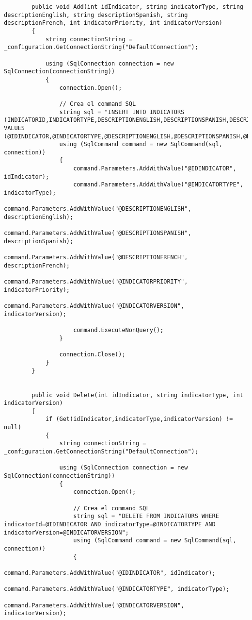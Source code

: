 \begin{itemize}
\begin{itemize}
\begin{lstlisting}
        public void Add(int idIndicator, string indicatorType, string descriptionEnglish, string descriptionSpanish, string descriptionFrench, int indicatorPriority, int indicatorVersion) 
        {
            string connectionString = _configuration.GetConnectionString("DefaultConnection");

            using (SqlConnection connection = new SqlConnection(connectionString))
            {
                connection.Open();

                // Crea el command SQL
                string sql = "INSERT INTO INDICATORS (INDICATORID,INDICATORTYPE,DESCRIPTIONENGLISH,DESCRIPTIONSPANISH,DESCRIPTIONFRENCH,INDICATORPRIORITY,INDICATORVERSION,ISACTIVE) VALUES (@IDINDICATOR,@INDICATORTYPE,@DESCRIPTIONENGLISH,@DESCRIPTIONSPANISH,@DESCRIPTIONFRENCH,@INDICATORPRIORITY,@INDICATORVERSION,1)";
                using (SqlCommand command = new SqlCommand(sql, connection))
                {
                    command.Parameters.AddWithValue("@IDINDICATOR", idIndicator);
                    command.Parameters.AddWithValue("@INDICATORTYPE", indicatorType);
                    command.Parameters.AddWithValue("@DESCRIPTIONENGLISH", descriptionEnglish);
                    command.Parameters.AddWithValue("@DESCRIPTIONSPANISH", descriptionSpanish);
                    command.Parameters.AddWithValue("@DESCRIPTIONFRENCH", descriptionFrench);
                    command.Parameters.AddWithValue("@INDICATORPRIORITY", indicatorPriority);
                    command.Parameters.AddWithValue("@INDICATORVERSION", indicatorVersion);

                    command.ExecuteNonQuery();
                }

                connection.Close();
            }
        }


        public void Delete(int idIndicator, string indicatorType, int indicatorVersion)
        {
            if (Get(idIndicator,indicatorType,indicatorVersion) != null)
            {
                string connectionString = _configuration.GetConnectionString("DefaultConnection");

                using (SqlConnection connection = new SqlConnection(connectionString))
                {
                    connection.Open();

                    // Crea el command SQL
                    string sql = "DELETE FROM INDICATORS WHERE indicatorId=@IDINDICATOR AND indicatorType=@INDICATORTYPE AND indicatorVersion=@INDICATORVERSION";
                    using (SqlCommand command = new SqlCommand(sql, connection))
                    {
                        command.Parameters.AddWithValue("@IDINDICATOR", idIndicator);
                        command.Parameters.AddWithValue("@INDICATORTYPE", indicatorType);
                        command.Parameters.AddWithValue("@INDICATORVERSION", indicatorVersion);


\end{lstlisting}
\end{itemize}
\end{itemize}

